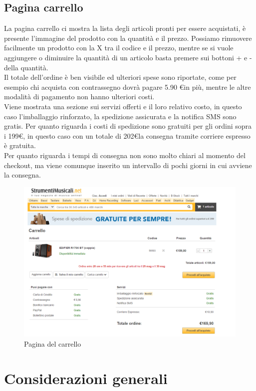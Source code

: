 \documentclass[12pt]{article}
\begin{document}
	\subsection{Pagina carrello}
	\vspace{0.4cm}
	La pagina carrello ci mostra la lista degli articoli pronti per essere acquistati, è presente l'immagine del prodotto con la quantità e il prezzo. Possiamo rimuovere facilmente un prodotto con la X tra il codice e il prezzo, mentre se si vuole aggiungere o diminuire la quantità di un articolo basta premere sui bottoni + e - della quantità.
	\\ Il totale dell'ordine è ben visibile ed ulteriori spese sono riportate, come per esempio chi acquista con contrassegno dovrà pagare 5.90 \euro in più, mentre le altre modalità di pagamento non hanno ulteriori costi. \\Viene mostrata una sezione sui servizi offerti e il loro relativo costo, in questo caso l'imballaggio rinforzato, la spedizione assicurata e la notifica SMS sono gratis. Per quanto riguarda i costi di spedizione sono gratuiti per gli ordini sopra i 199\euro, in questo caso con un totale di 202\euro la consegna tramite corriere espresso è gratuita. 
	\\ Per quanto riguarda i tempi di consegna non sono molto chiari al momento del checkout, ma viene comunque inserito un intervallo di pochi giorni in cui avviene la consegna.
	\begin{figure}
		\centering	
		\includegraphics[width=180mm]{images/carrello.png}
		\caption{Pagina del carrello}
	\end{figure}
	\newpage
	\section{Considerazioni generali}
	
\end{document}
